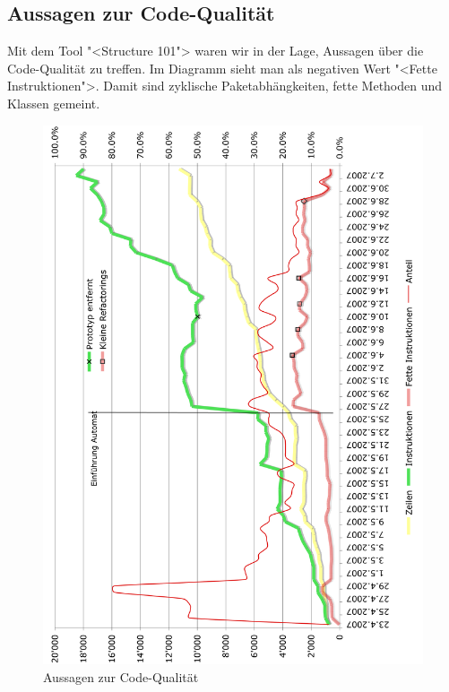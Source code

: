 \documentclass[12pt,halfparskip]{scrartcl}
\begin{document}
\subsection{Aussagen zur Code-Qualität}
Mit dem Tool "<Structure 101"> waren wir in der Lage, Aussagen über die Code-Qualität zu treffen. Im Diagramm sieht man als negativen Wert "<Fette Instruktionen">. Damit sind zyklische Paketabhängkeiten, fette Methoden und Klassen gemeint.
\begin{figure}[h]
	\centering
	\includegraphics[width=0.8 \textwidth]{code_qualitaet}
	\caption{Aussagen zur Code-Qualität}
	\label{fig:code_qualitaet}
\end{figure}
\end{document}
